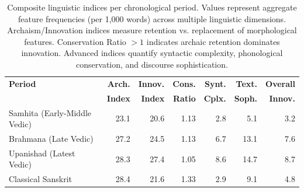 \begin{table}[ht]
\centering
\caption{Composite linguistic indices per chronological period. Values represent aggregate feature frequencies (per 1,000 words) across multiple linguistic dimensions. Archaism/Innovation indices measure retention vs. replacement of morphological features. Conservation Ratio $>1$ indicates archaic retention dominates innovation. Advanced indices quantify syntactic complexity, phonological conservation, and discourse sophistication.}
\label{tab:period-detection}
\small
\begin{tabular}{lrrrrrr}
\toprule
\textbf{Period} & \textbf{Arch.} & \textbf{Innov.} & \textbf{Cons.} & \textbf{Synt.} & \textbf{Text.} & \textbf{Overall} \\
 & \textbf{Index} & \textbf{Index} & \textbf{Ratio} & \textbf{Cplx.} & \textbf{Soph.} & \textbf{Innov.} \\
\midrule
Samhita (Early-Middle Vedic) & 23.1 & 20.6 & 1.13 & 2.8 & 5.1 & 3.2 \\
Brahmana (Late Vedic) & 27.2 & 24.5 & 1.13 & 6.7 & 13.1 & 7.6 \\
Upanishad (Latest Vedic) & 28.3 & 27.4 & 1.05 & 8.6 & 14.7 & 8.7 \\
Classical Sanskrit & 28.4 & 21.6 & 1.33 & 2.9 & 9.1 & 4.8 \\
\bottomrule
\end{tabular}
\end{table}